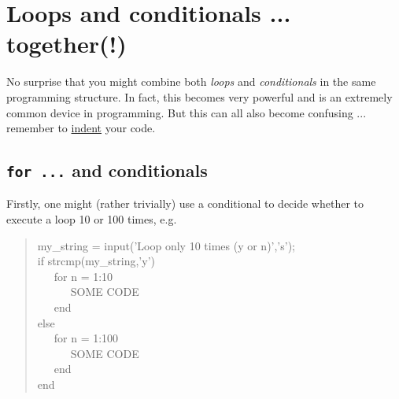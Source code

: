 \documentclass{tufte-book} %
\newenvironment{docspec}{\begin{quotation}\ttfamily\parskip0pt\parindent0pt\ignorespaces}{\end{quotation}}
\begin{document}

\newpage


\section{Loops and conditionals ... together(!)}


No surprise that you might combine both \textit{loops} and \textit{conditionals} in the same programming structure. In fact, this becomes very powerful and is an extremely common device in programming. But this can all also become confusing ... remember to \uline{indent} your code.



\subsection{\texttt{for ...} and conditionals}

Firstly, one might (rather trivially) use a conditional to decide whether to execute a loop 10 or 100 times, e.g.

\begin{docspec}
my\_string = input('Loop only 10 times (y or n)','s');
\\ if strcmp(my\_string,'y')
\\ \ \ \ for n = 1:10
\\ \ \ \ \ \ \ SOME CODE
\\ \ \ \ end
\\ else
\\ \ \ \ for n = 1:100
\\ \ \ \ \ \ \ SOME CODE
\\ \ \ \ end
\\ end
\end{docspec}
\end{document}
